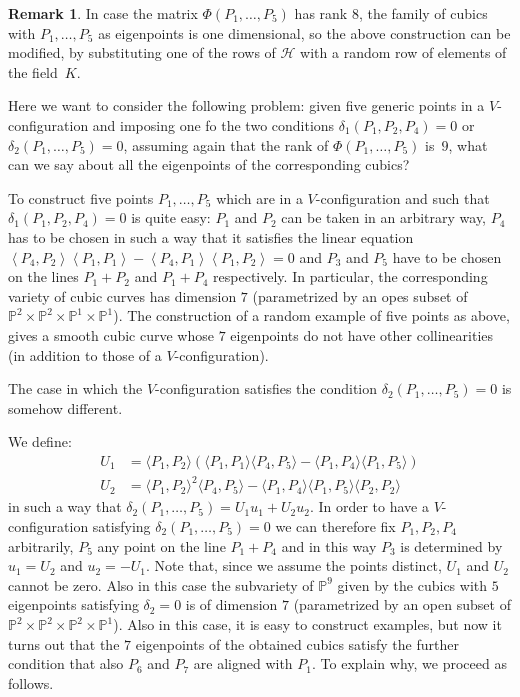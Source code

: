 \documentclass[11pt, a4paper, reqno, captions=tableheading,bibliography=totoc]{scrartcl}
\theoremstyle{plain}
\theoremstyle{definition}
\newtheorem{rmk}[lemma]{Remark}
\newcommand{\scl}[2]{\left\langle {#1}, {#2} \right\rangle}
\begin{document}
\begin{rmk}
In case the matrix $\Phi(P_1, \dots, P_5)$ has rank $8$, the family of
cubics with $P_1, \dots, P_5$ as eigenpoints is one dimensional, so the
above construction can be modified, by substituting one of the rows of
$\mathcal{H}$ with a random row of elements of the field~$K$.
\end{rmk}

Here we want to consider the following problem:
given five generic points in a $V$-configuration and imposing one
fo the two conditions
$\delta_1(P_1, P_2, P_4) = 0$ or $\delta_2(P_1, \dots, P_5) = 0$, assuming
again that the rank of $\Phi(P_1, \dots, P_5)$ is~$9$, what
can we say about all the eigenpoints of the corresponding cubics?


To construct five points $P_1, \dots, P_5$ which are in a $V$-configuration
and such that $\delta_1(P_1, P_2, P_4)= 0$ is quite easy: $P_1$
and $P_2$ can be taken in an arbitrary way, $P_4$ has to be chosen in such
a way that it satisfies the linear
equation $\scl{P_4}{P_2}\scl{P_1}{P_1}-\scl{P_4}{P_1}\scl{P_1}{P_2} = 0$
and $P_3$ and $P_5$ have to be chosen on the lines $P_1+P_2$ and $P_1+P_4$
respectively. In particular, the corresponding variety of cubic curves
has dimension $7$ (parametrized by an opes subset of
$\mathbb{P}^2\times \mathbb{P}^2 \times
\mathbb{P}^1\times  \mathbb{P}^1$).
The construction of a random example
of five points as above, gives a smooth cubic curve whose $7$ eigenpoints
do not have other collinearities (in addition to those of a
$V$-configuration).

The case in which the $V$-configuration satisfies the condition
$\delta_2(P_1, \dots, P_5) = 0$ is somehow different.

We define:
\begin{equation}
  \begin{split}
    U_1 & =  \langle P_1, P_2\rangle \left(\langle P_1, P_1\rangle
  \langle P_4,P_5\rangle - \langle P_1, P_4\rangle \langle P_1, P_5\rangle
  \right)\\
  U_2 & =  \langle P_1, P_2\rangle^2\langle P_4, P_5\rangle
  -\langle P_1, P_4\rangle \langle P_1, P_5\rangle \langle P_2, P_2\rangle
  \label{sst2}
  \end{split}
\end{equation}
in such a way that
$\delta_2(P_1, \dots, P_5) = U_1u_1+U_2u_2$. In order to
have a $V$-configuration satisfying $\delta_2(P_1, \dots, P_5) = 0$ we can
therefore fix $P_1, P_2, P_4$ arbitrarily, $P_5$ any point 
on the line $P_1+P_4$ and in this
way $P_3$ is determined by $u_1 = U_2$ and $u_2 = -U_1$. Note that,
since we assume the points distinct, $U_1$ and $U_2$ cannot be zero.
Also in this case
the subvariety of $\mathbb{P}^9$ given by the cubics with $5$
eigenpoints satisfying $\delta_2 = 0$ is of dimension $7$
(parametrized by an open subset of
$\mathbb{P}^2\times \mathbb{P}^2 \times \mathbb{P}^2\times \mathbb{P}^1$).
Also in this case, it is easy to construct examples, but now it turns out that
the $7$ eigenpoints of the obtained cubics satisfy the further
condition that also $P_6$ and $P_7$ are aligned with $P_1$. To explain
why, we proceed as follows.
\end{document}
